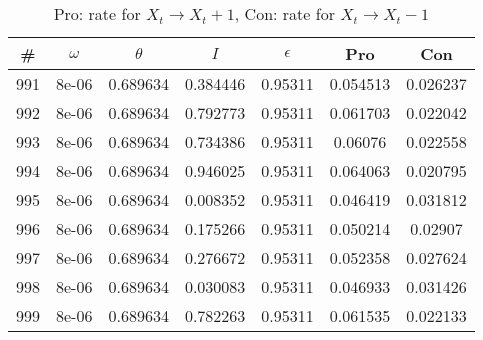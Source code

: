 \newpage
\begin{table}
\caption{Pro: rate for $X_t \rightarrow X_t + 1$, Con: rate for $X_t \rightarrow X_t - 1$}
\begin{tabular*}{\linewidth}{c|c|c|c|c|c|c}
\# & $\omega$ & $\theta$ & $I$ & $\epsilon$ & Pro & Con \\
\hline
991 & 8e-06 & 0.689634 & 0.384446 & 0.95311 & 0.054513 & 0.026237\\
992 & 8e-06 & 0.689634 & 0.792773 & 0.95311 & 0.061703 & 0.022042\\
993 & 8e-06 & 0.689634 & 0.734386 & 0.95311 & 0.06076 & 0.022558\\
994 & 8e-06 & 0.689634 & 0.946025 & 0.95311 & 0.064063 & 0.020795\\
995 & 8e-06 & 0.689634 & 0.008352 & 0.95311 & 0.046419 & 0.031812\\
996 & 8e-06 & 0.689634 & 0.175266 & 0.95311 & 0.050214 & 0.02907\\
997 & 8e-06 & 0.689634 & 0.276672 & 0.95311 & 0.052358 & 0.027624\\
998 & 8e-06 & 0.689634 & 0.030083 & 0.95311 & 0.046933 & 0.031426\\
999 & 8e-06 & 0.689634 & 0.782263 & 0.95311 & 0.061535 & 0.022133\\
\end{tabular*}
\end{table}